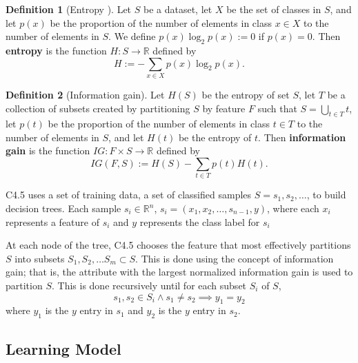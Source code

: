 \documentclass[12pt]{amsproc}
\newcommand\R{{\mathbb R}}
\theoremstyle{definition}
\newtheorem{definition}{Definition}
\begin{document}

	\begin{definition}[Entropy \cite{shannon}]
		Let $S$ be a dataset, let $X$ be the set of classes in $S$, and let $p(x)$ be the proportion of the number of elements in class $x \in X$ to the number of elements in $S$. We define $p(x) \log_2 p(x) := 0$ if $p(x) = 0$. Then \textbf{entropy} is the function $H:S \to \R$ defined by 
		$$H := -\sum_{x \in X} p(x) \log_2 p(x).$$
	\end{definition}
	
	\begin{definition}[Information gain]
		Let $H(S)$ be the entropy of set $S$, let $T$ be a collection of subsets created by partitioning $S$ by feature $F$ such that $S = \bigcup_{t \in T}t$, let $p(t)$ be the proportion of the number of elements in class $t \in T$ to the number of elements in $S$, and let $H(t)$ be the entropy of $t$. 
		Then \textbf{information gain} is the function $IG: F \times S \to \R$ defined by 
		$$IG(F, S) := H(S) - \sum_{t \in T} p(t) H(t).$$
	\end{definition}
	
	C4.5 uses a set of training data, a set of classified samples $S = s_1,s_2,\ldots$, to build decision trees. Each sample $s_i \in \R^n$, $s_i = (x_1,x_2,\ldots,s_{n-1}, y)$, where each $x_i$ represents a feature of $s_i$ and $y$ represents the class label for $s_i$ 
	
	At each node of the tree, C4.5 chooses the feature that most effectively partitions $S$ into subsets $S_1, S_2, \ldots S_m \subset S$. This is done using the concept of information gain; that is, the attribute with the largest normalized information gain is used to partition $S$. This is done recursively until for each subset $S_i$ of $S$, $$s_1, s_2 \in S_i \wedge s_1 \neq s_2 \implies y_1 = y_2$$
	where $y_1$ is the $y$ entry in $s_1$ and $y_2$ is the $y$ entry in $s_2$.

	\subsection{Learning Model}\label{implementation:learning model}
	
\end{document}
